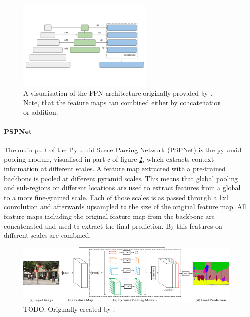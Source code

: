 \begin{figure}
	\centering
	\includegraphics[width=0.6\textwidth]{fig/fpn-architecture.png}
	\caption{A visualisation of the FPN architecture originally provided by \citeauthor{SegmentationModels} \cite{SegmentationModels}. Note, that the feature maps can combined either by concatenation or addition.}
	\label{fig:fpn-architecture}
\end{figure}


\paragraph{PSPNet}

The main part of the Pyramid Scene Parsing Network (PSPNet) is the pyramid pooling module, visualised in part c of figure \ref{fig:pspnet-architecture}, which extracts context information at different scales. A feature map extracted with a pre-trained backbone is pooled at different pyramid scales. This means that global pooling and sub-regions on different locations are used to extract features from a global to a more fine-grained scale. Each of those scales is as passed through a 1x1 convolution and afterwards upsampled to the size of the original feature map. All feature maps including the original feature map from the backbone are concatenated and used to extract the final prediction. By this features on different scales are combined. \cite{Zhao2017, ArcGIS}

\begin{figure}
	\centering
	\includegraphics[width=\textwidth]{fig/pspnet-architecture.png}
	\caption{TODO. Originally created by \citeauthor{Zhao2017} \cite{Zhao2017}.}
	\label{fig:pspnet-architecture}
\end{figure}

